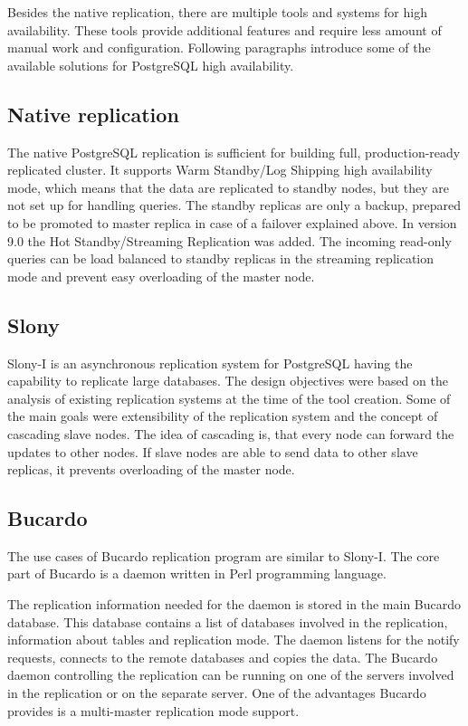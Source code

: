 \documentclass[
  digital, %
  twoside, %
  table,   %
  lof,     %
  lot,     %
]{fithesis3}
\begin{document}
Besides the native replication, there are multiple tools and systems for high availability. These tools provide additional features and require less amount of manual work and configuration. Following paragraphs introduce some of the available solutions for PostgreSQL high availability.

\subsection{Native replication}
The native PostgreSQL replication is sufficient for building full, production-ready replicated cluster. It supports Warm Standby/Log Shipping high availability mode, which means that the data are replicated to standby nodes, but they are not set up for handling queries. The standby replicas are only a backup, prepared to be promoted to master replica in case of a failover explained above. In version 9.0 the Hot Standby/Streaming Replication was added. The incoming read-only queries can be load balanced to standby replicas in the streaming replication mode and prevent easy overloading of the master node.

\subsection{Slony}
Slony-I \cite{slony} is an asynchronous replication system for PostgreSQL having the capability to replicate large databases. The design objectives were based on the analysis of existing replication systems at the time of the tool creation. Some of the main goals were extensibility of the replication system and the concept of cascading slave nodes. The idea of cascading is, that every node can forward the updates to other nodes. If slave nodes are able to send data to other slave replicas, it prevents overloading of the master node.

\subsection{Bucardo}
The use cases of Bucardo \cite{bucardo} replication program are similar to Slony-I. The core part of Bucardo is a daemon written in Perl \cite{perl} programming language.

The replication information needed for the daemon is stored in the main Bucardo database. This database contains a list of databases involved in the replication, information about tables and replication mode. The daemon listens for the notify requests, connects to the remote databases and copies the data. The Bucardo daemon controlling the replication can be running on one of the servers involved in the replication or on the separate server. One of the advantages Bucardo provides is a multi-master replication mode support.
\end{document}
